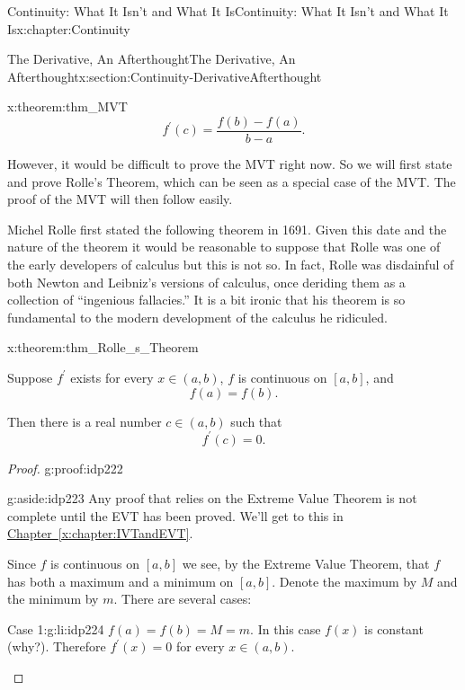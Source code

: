 \begin{chapterptx}{Continuity: What It Isn't and What It Is}{}{Continuity: What It Isn't and What It Is}{}{}{x:chapter:Continuity}
\begin{sectionptx}{The Derivative, An Afterthought}{}{The Derivative, An Afterthought}{}{}{x:section:Continuity-DerivativeAfterthought}
\begin{theorem}{}{}{x:theorem:thm_MVT}
			\begin{equation*}
				f^\prime(c)=\frac{f(b)-f(a)}{b-a}.{}
			\end{equation*}
		\end{theorem}
		However, it would be difficult to prove the MVT right now. So we will first state and prove Rolle's Theorem, which can be seen as a special case of the MVT. The proof of the MVT will then follow easily.%
		\par
		Michel Rolle first stated the following theorem in 1691. Given this date and the nature of the theorem it would be reasonable to suppose that Rolle was one of the early developers of calculus but this is not so. In fact, Rolle was disdainful of both Newton  and Leibniz's versions of calculus, once deriding them as a collection of ``ingenious fallacies.'' It is a bit ironic that his theorem is so fundamental to the modern development of the calculus he ridiculed.%
		\begin{theorem}{}{}{x:theorem:thm_Rolle_s_Theorem}%
			\par
			Suppose \(f^\prime\) exists for every \(x\in(a,b)\), \(f\) is continuous on \([a,b]\), and%
			\begin{equation*}
				f(a)=f(b)\text{.}
			\end{equation*}
			\par
			Then there is a real number \(c\in(a,b)\) such that%
			\begin{equation*}
				f^\prime(c)=0\text{.}
			\end{equation*}
		\end{theorem}
		\begin{proof}{}{g:proof:idp222}
			\begin{aside}{}{g:aside:idp223}%
				Any proof that relies on the Extreme Value Theorem is not complete until the EVT has been proved. We'll get to this in \hyperref[x:chapter:IVTandEVT]{Chapter~{\xreffont\ref{x:chapter:IVTandEVT}}}.%
			\end{aside}
			Since \(f\) is continuous on \([a,b]\) we see, by the Extreme Value Theorem, that \(f\) has both a maximum and a minimum on \([a,b]\). Denote the maximum by \(M\) and the minimum by \(m\). There are several cases:%
			\begin{descriptionlist}
				\begin{dlimedium}{Case 1:}{g:li:idp224}%
					\(f(a)=f(b)=M=m\). In this case \(f(x)\) is constant (why?). Therefore \(f^\prime(x)=0\) for every \(x\in(a,b)\).%

\end{dlimedium}
\end{descriptionlist}
\end{proof}
\end{sectionptx}
\end{chapterptx}
